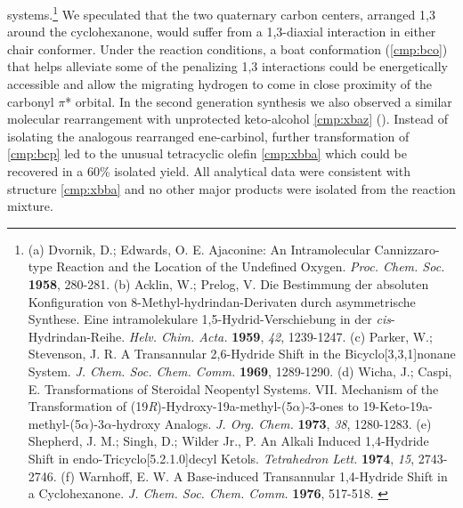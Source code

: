 systems.\footnote{(a) {\frenchspacing Dvornik, D.; Edwards, O. E. Ajaconine: An Intramolecular
Cannizzaro-type Reaction and the Location of the Undefined Oxygen. \textit{Proc. Chem. Soc.}
\textbf{1958}, 280-281.} (b) {\frenchspacing Acklin, W.; Prelog, V. Die Bestimmung der absoluten
Konfiguration von 8-Methyl-hydrindan-Derivaten durch asymmetrische Synthese. Eine intramolekulare
1,5-Hydrid-Verschiebung in der \textit{cis}-Hydrindan-Reihe. \textit{Helv. Chim. Acta.}
\textbf{1959}, \textit{42}, 1239-1247.} (c) {\frenchspacing Parker, W.; Stevenson, J. R. A
Transannular 2,6-Hydride Shift in the Bicyclo[3,3,1]nonane System. \textit{J. Chem. Soc. Chem.
Comm.} \textbf{1969}, 1289-1290.} (d) {\frenchspacing Wicha, J.; Caspi, E. Transformations of
Steroidal Neopentyl Systems. VII. Mechanism of the Transformation of
(19\textit{R})-Hydroxy-19a-methyl-(5$\alpha$)-3-ones to
19-Keto-19a-methyl-(5$\alpha$)-3$\alpha$-hydroxy Analogs. \textit{J. Org. Chem.} \textbf{1973},
\textit{38}, 1280-1283.} (e) {\frenchspacing Shepherd, J. M.; Singh, D.; Wilder Jr., P. An Alkali
Induced 1,4-Hydride Shift in endo-Tricyclo[5.2.1.0]decyl Ketols. \textit{Tetrahedron Lett.}
\textbf{1974}, \textit{15}, 2743-2746.} (f) {\frenchspacing Warnhoff, E. W. A Base-induced
Transannular 1,4-Hydride Shift in a Cyclohexanone. \textit{J. Chem. Soc. Chem. Comm.} \textbf{1976},
517-518.} \label{ref:hydriderefs}} We speculated that the two quaternary carbon centers, arranged
1,3 around the cyclohexanone, would suffer from a 1,3-diaxial interaction in either chair conformer. Under the
reaction conditions, a boat conformation (\ref{cmp:bco}) that helps alleviate some of the penalizing
1,3 interactions could be energetically accessible and allow the migrating hydrogen to come in close
proximity of the carbonyl $\pi$* orbital. In the second generation synthesis we also observed a similar molecular rearrangement with
unprotected keto-alcohol \ref{cmp:xbaz} (). Instead of isolating the analogous 
rearranged ene-carbinol, further transformation of \ref{cmp:bcp} led to the unusual tetracyclic
olefin \ref{cmp:xbba} which could be recovered in a 60\% isolated yield. All analytical data were
consistent with structure \ref{cmp:xbba} and no other major products were isolated from the reaction
mixture.
